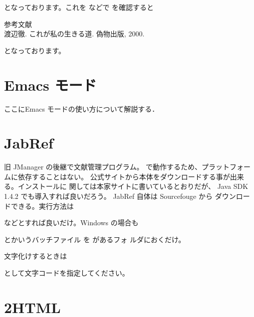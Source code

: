 となっております。これを  などで  を確認すると

\begin{OutText}
 {\large\gtfamily 参考文献}\\ \relax
 [1] 渡辺徹. これが私の生きる道. 偽物出版, 2000.
\end{OutText}

となっております。


\section{Emacs \BibTeX モード}

\begin{append}
 ここにEmacs \BibTeX モードの使い方について解説する．
\end{append}

\section{JabRef}

旧 J\BibTeX Manager の後継で文献管理プログラム。  
で動作するため、プラットフォームに依存することはない。 
公式サイトから本体をダウンロードする事が出来る。インストールに
関しては本家サイトに書いているとおりだが、 Java SDK 1.4.2 
でも導入すれば良いだろう。 JabRef 自体は Sourcefouge から
ダウンロードできる。実行方法は
\begin{InTerm}
\end{InTerm}

などとすれば良いだけ。Windows の場合も
\begin{InTerm}
\end{InTerm}
とかいうバッチファイル  を  があるフォ
ルダにおくだけ。

文字化けするときは
\begin{InTerm}
\end{InTerm}
として文字コードを指定してください。






\section{\texorpdfstring{\BibTeX2HTML}{BibTeX2HTML}}

